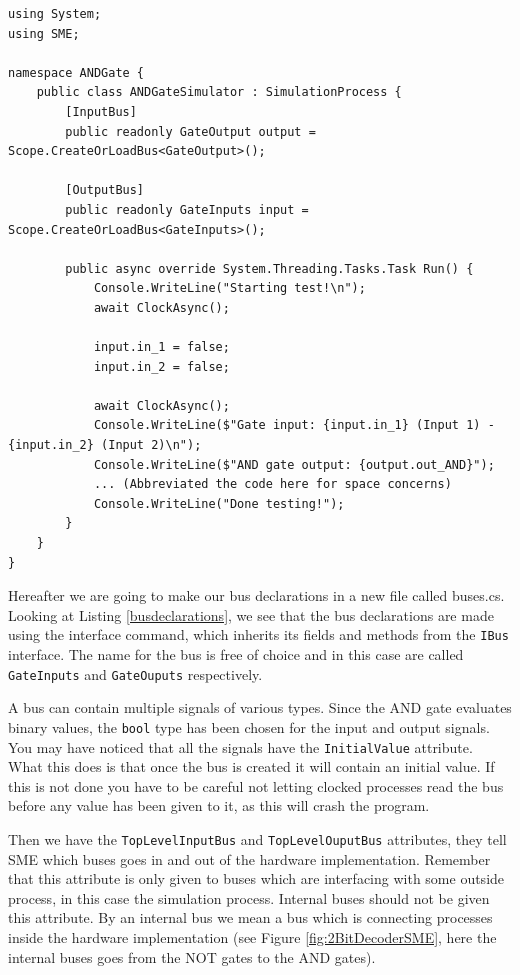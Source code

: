 \begin{lstlisting}[language={[Sharp]C}, caption={The simulator file, which specifies how the simulation is run. Most lines in the run method are concatenated brievity.},captionpos=b, label = simulatorfile]
using System;
using SME;

namespace ANDGate {
    public class ANDGateSimulator : SimulationProcess {
        [InputBus]
        public readonly GateOutput output = Scope.CreateOrLoadBus<GateOutput>();
        
        [OutputBus]
        public readonly GateInputs input = Scope.CreateOrLoadBus<GateInputs>();
        
        public async override System.Threading.Tasks.Task Run() {
            Console.WriteLine("Starting test!\n");
            await ClockAsync();
            
            input.in_1 = false;
            input.in_2 = false;
            
            await ClockAsync();
            Console.WriteLine($"Gate input: {input.in_1} (Input 1) - {input.in_2} (Input 2)\n");
            Console.WriteLine($"AND gate output: {output.out_AND}");
            ... (Abbreviated the code here for space concerns)
            Console.WriteLine("Done testing!");
        }
    }
}
\end{lstlisting}
\newpage
        Hereafter we are going to make our bus declarations in a new file called buses.cs. Looking at Listing \ref{busdeclarations}, we see that the bus declarations are made using the interface command, which inherits its fields and methods from the \texttt{IBus} interface. The name for the bus is free of choice and in this case are called \texttt{GateInputs} and \texttt{GateOuputs} respectively.
        
        A bus can contain multiple signals of various types. Since the AND gate evaluates binary values, the \texttt{bool} type has been chosen for the input and output signals. You may have noticed that all the signals have the \texttt{InitialValue} attribute. What this does is that once the bus is created it will contain an initial value. If this is not done you have to be careful not letting clocked processes read the bus before any value has been given to it, as this will crash the program.
        
        Then we have the \texttt{TopLevelInputBus} and \texttt{TopLevelOuputBus} attributes, they tell SME which buses goes in and out of the hardware implementation. Remember that this attribute is only given to buses which are interfacing with some outside process, in this case the simulation process. Internal buses should not be given this attribute. By an internal bus we mean a bus which is connecting processes inside the hardware implementation (see Figure \ref{fig:2BitDecoderSME}, here the internal buses goes from the NOT gates to the AND gates).

